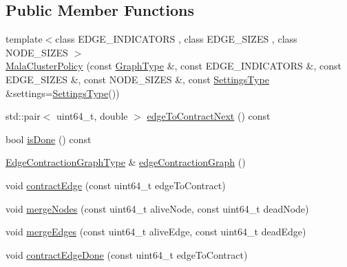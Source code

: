 \subsection*{Public Member Functions}
\begin{DoxyCompactItemize}
\item 
{\footnotesize template$<$class E\+D\+G\+E\+\_\+\+I\+N\+D\+I\+C\+A\+T\+O\+R\+S , class E\+D\+G\+E\+\_\+\+S\+I\+Z\+E\+S , class N\+O\+D\+E\+\_\+\+S\+I\+Z\+E\+S $>$ }\\\hyperlink{classnifty_1_1graph_1_1agglo_1_1MalaClusterPolicy_a764281b5b0b47bdec55ec8ab031100aa}{Mala\+Cluster\+Policy} (const \hyperlink{classnifty_1_1graph_1_1agglo_1_1MalaClusterPolicy_ae2696b85f3f04787282e003bead20a5d}{Graph\+Type} \&, const E\+D\+G\+E\+\_\+\+I\+N\+D\+I\+C\+A\+T\+O\+R\+S \&, const E\+D\+G\+E\+\_\+\+S\+I\+Z\+E\+S \&, const N\+O\+D\+E\+\_\+\+S\+I\+Z\+E\+S \&, const \hyperlink{structnifty_1_1graph_1_1agglo_1_1MalaClusterPolicy_1_1SettingsType}{Settings\+Type} \&settings=\hyperlink{structnifty_1_1graph_1_1agglo_1_1MalaClusterPolicy_1_1SettingsType}{Settings\+Type}())
\item 
std\+::pair$<$ uint64\+\_\+t, double $>$ \hyperlink{classnifty_1_1graph_1_1agglo_1_1MalaClusterPolicy_a4ca63d2eb3a592e0f5b13ad29ef2e8c8}{edge\+To\+Contract\+Next} () const 
\item 
bool \hyperlink{classnifty_1_1graph_1_1agglo_1_1MalaClusterPolicy_abdd3019e33491993887de4cd534ca2af}{is\+Done} () const 
\item 
\hyperlink{classnifty_1_1graph_1_1agglo_1_1MalaClusterPolicy_a77a5b41304b53955aafbf214e2ad356f}{Edge\+Contraction\+Graph\+Type} \& \hyperlink{classnifty_1_1graph_1_1agglo_1_1MalaClusterPolicy_a77f322e55d36b39340ced1233b7e5852}{edge\+Contraction\+Graph} ()
\item 
void \hyperlink{classnifty_1_1graph_1_1agglo_1_1MalaClusterPolicy_a7001dcc73b1f93bcf5f2cbd1fa540dd8}{contract\+Edge} (const uint64\+\_\+t edge\+To\+Contract)
\item 
void \hyperlink{classnifty_1_1graph_1_1agglo_1_1MalaClusterPolicy_abd796017f547240be8ea4c3945a545f0}{merge\+Nodes} (const uint64\+\_\+t alive\+Node, const uint64\+\_\+t dead\+Node)
\item 
void \hyperlink{classnifty_1_1graph_1_1agglo_1_1MalaClusterPolicy_a0e6988bea57746b1395837cb0fedc10c}{merge\+Edges} (const uint64\+\_\+t alive\+Edge, const uint64\+\_\+t dead\+Edge)
\item 
void \hyperlink{classnifty_1_1graph_1_1agglo_1_1MalaClusterPolicy_a14238cc6529f3a585aef89c6a99407a1}{contract\+Edge\+Done} (const uint64\+\_\+t edge\+To\+Contract)
\end{DoxyCompactItemize}
